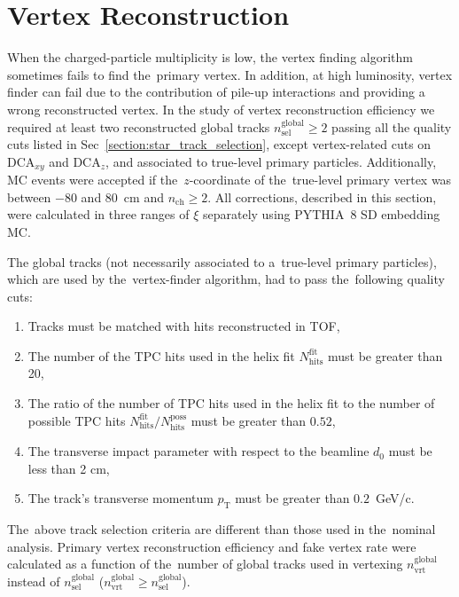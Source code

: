 \section{Vertex Reconstruction}\label{section:star_vertex}

When the charged-particle multiplicity is low, the vertex finding algorithm sometimes fails to find the~primary vertex. In addition, at high luminosity, vertex finder can fail due to the contribution of pile-up interactions and providing a wrong reconstructed vertex. In the study of vertex reconstruction efficiency we required at least two reconstructed global tracks $n^\textrm{global}_\textrm{sel}\geq 2$ passing all the quality cuts listed in Sec~\ref{section:star_track_selection}, except vertex-related cuts on $\textrm{DCA}_{xy}$ and $\textrm{DCA}_{z}$,  and  associated to true-level primary particles.  Additionally, MC events were accepted if the~$z$-coordinate of the~true-level primary vertex was between $-80$ and $80$~cm and $n_\textrm{ch}\geq 2$. All corrections, described in this section, were calculated in three ranges of $\xi$ separately using PYTHIA~8 \ac{SD} embedding \ac{MC}.

The global tracks (not necessarily associated to a~true-level primary particles), which are used by the~vertex-finder algorithm, had to pass the~following quality cuts:
\begin{enumerate}
	\item Tracks must be matched with hits reconstructed in TOF,
	\item The number of the TPC hits used in the helix fit $N_\textrm{hits}^\textrm{fit}$ must be greater than 20,
	\item The ratio of the number of TPC hits used in the helix fit to the number of possible TPC hits $N_\textrm{hits}^\textrm{fit}/N_\textrm{hits}^\textrm{poss}$ must be greater than $0.52$,
	\item The transverse impact parameter with respect to the beamline $d_0$ must be less than 2 cm,
	\item The track's transverse momentum $p_\textrm{T}$ must be greater than $0.2$~GeV/c.
\end{enumerate}
 The~above track selection criteria are different than those used in the~nominal analysis. Primary vertex reconstruction efficiency and fake vertex rate were calculated as a function of the~number of global tracks used in vertexing $n^\textrm{global}_\textrm{vrt}$ instead of $n^\textrm{global}_\textrm{sel}$ ($n^\textrm{global}_\textrm{vrt}\geq n^\textrm{global}_\textrm{sel}$). 

